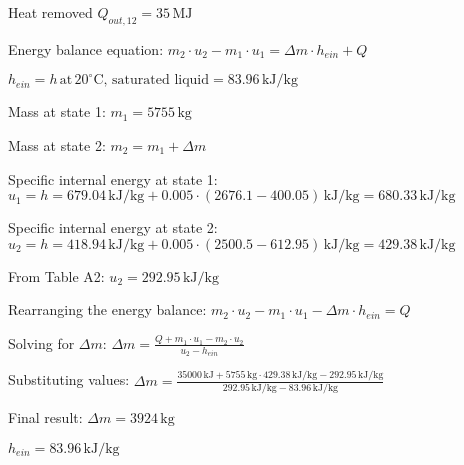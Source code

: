 Heat removed \( Q_{out,12} = 35 \, \text{MJ} \)  

Energy balance equation:  
\( m_2 \cdot u_2 - m_1 \cdot u_1 = \Delta m \cdot h_{ein} + Q \)  

\( h_{ein} = h \, \text{at} \, 20^\circ \text{C}, \, \text{saturated liquid} = 83.96 \, \text{kJ/kg} \)  

Mass at state 1:  
\( m_1 = 5755 \, \text{kg} \)  

Mass at state 2:  
\( m_2 = m_1 + \Delta m \)  

Specific internal energy at state 1:  
\( u_1 = h = 679.04 \, \text{kJ/kg} + 0.005 \cdot (2676.1 - 400.05) \, \text{kJ/kg} = 680.33 \, \text{kJ/kg} \)  

Specific internal energy at state 2:  
\( u_2 = h = 418.94 \, \text{kJ/kg} + 0.005 \cdot (2500.5 - 612.95) \, \text{kJ/kg} = 429.38 \, \text{kJ/kg} \)  

From Table A2:  
\( u_2 = 292.95 \, \text{kJ/kg} \)  

Rearranging the energy balance:  
\( m_2 \cdot u_2 - m_1 \cdot u_1 - \Delta m \cdot h_{ein} = Q \)  

Solving for \( \Delta m \):  
\( \Delta m = \frac{Q + m_1 \cdot u_1 - m_2 \cdot u_2}{u_2 - h_{ein}} \)  

Substituting values:  
\( \Delta m = \frac{35000 \, \text{kJ} + 5755 \, \text{kg} \cdot 429.38 \, \text{kJ/kg} - 292.95 \, \text{kJ/kg}}{292.95 \, \text{kJ/kg} - 83.96 \, \text{kJ/kg}} \)  

Final result:  
\( \Delta m = 3924 \, \text{kg} \)  

\( h_{ein} = 83.96 \, \text{kJ/kg} \)